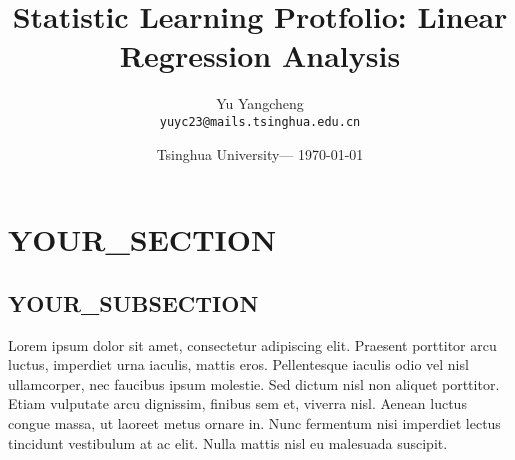 \documentclass[main]{subfiles}
\title{Statistic Learning Protfolio: Linear Regression Analysis} %
\author{Yu Yangcheng\\ \texttt{yuyc23@mails.tsinghua.edu.cn}} %
\date{Tsinghua University--- \today} %
\begin{document}
\maketitle %


\section{YOUR_SECTION} %

\subsection{YOUR_SUBSECTION}
Lorem ipsum dolor sit amet, consectetur adipiscing elit. Praesent porttitor arcu luctus, imperdiet urna iaculis, mattis eros. Pellentesque iaculis odio vel nisl ullamcorper, nec faucibus ipsum molestie. Sed dictum nisl non aliquet porttitor. Etiam vulputate arcu dignissim, finibus sem et, viverra nisl. Aenean luctus congue massa, ut laoreet metus ornare in. Nunc fermentum nisi imperdiet lectus tincidunt vestibulum at ac elit. Nulla mattis nisl eu malesuada suscipit.
\end{document}
